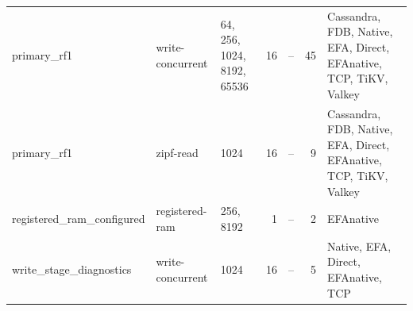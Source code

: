 \begin{landscape}
\begin{longtable}{p{3cm}p{2.5cm}p{3.1cm}rrrp{7cm}}
primary\_\allowbreak{}rf1 & write-concurrent & 64, 256, 1024, 8192, 65536 & 16 & -- & 45 & Cassandra, FDB, Native, EFA, Direct, EFAnative, TCP, TiKV, Valkey\\
primary\_\allowbreak{}rf1 & zipf-read & 1024 & 16 & -- & 9 & Cassandra, FDB, Native, EFA, Direct, EFAnative, TCP, TiKV, Valkey\\
registered\_\allowbreak{}ram\_\allowbreak{}configured & registered-ram & 256, 8192 & 1 & -- & 2 & EFAnative\\
write\_\allowbreak{}stage\_\allowbreak{}diagnostics & write-concurrent & 1024 & 16 & -- & 5 & Native, EFA, Direct, EFAnative, TCP\\
\end{longtable}
\normalsize
\end{landscape}


